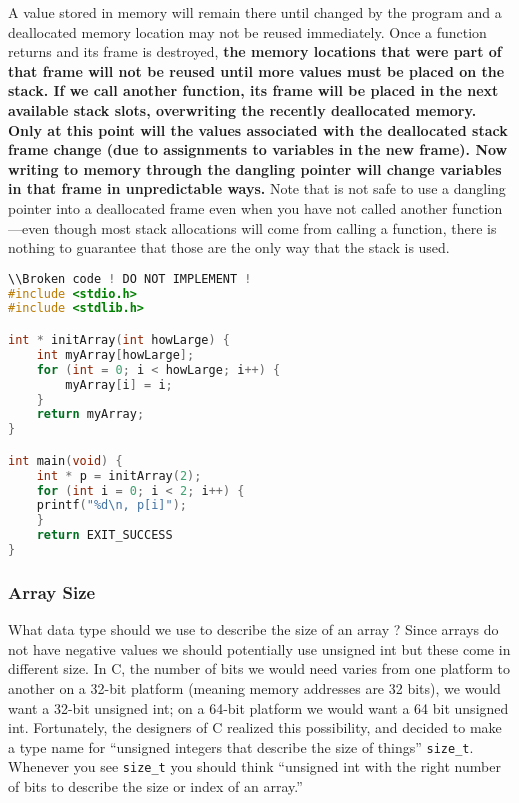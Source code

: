 \documentclass[12pt,a4paper]{article}
\begin{document}
A value stored in memory will remain there until changed by the program and a
deallocated memory location may not be reused immediately. Once a function
returns and its frame is destroyed, \textbf{the memory locations that were part
of that frame will not be reused until more values must be placed on the stack.
If we call another function, its frame will be placed in the next available
stack slots, overwriting the recently deallocated memory. Only at this point
will the values associated with the deallocated stack frame change (due to
assignments to variables in the new frame). Now writing to memory through the
dangling pointer will change variables in that frame in unpredictable ways.}
Note that is not safe to use a dangling pointer into a deallocated frame even
when you have not called another function—even though most stack allocations
will come from calling a function, there is nothing to guarantee that those are
the only way that the stack is used.

\begin{lstlisting}[language=C]
\\Broken code ! DO NOT IMPLEMENT !
#include <stdio.h>
#include <stdlib.h>

int * initArray(int howLarge) {
	int myArray[howLarge];
	for (int = 0; i < howLarge; i++) {
		myArray[i] = i;
	}
	return myArray;
}

int main(void) {
	int * p = initArray(2);
	for (int i = 0; i < 2; i++) {
	printf("%d\n, p[i]");
	}
	return EXIT_SUCCESS
}

\end{lstlisting}

\subsubsection{Array Size}
What data type should we use to describe the size of an array ? Since arrays do
not have negative values we should potentially use unsigned int but these come
in different size.  In C, the number of bits we would need varies from one
platform to another on a 32-bit platform (meaning memory addresses are 32
bits), we would want a 32-bit unsigned int; on a 64-bit platform we would want
a 64 bit unsigned int. Fortunately, the designers of C realized this
possibility, and decided to make a type name for “unsigned integers that
describe the size of things” \verb|size_t|. Whenever you see \verb|size_t| you
should think “unsigned int with the right number of bits to describe the size
or index of an array.”
\end{document}
